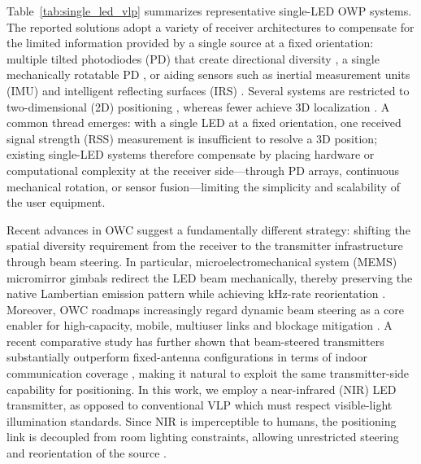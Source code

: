 \documentclass[journal]{IEEEtran}
\begin{document}
Table~\ref{tab:single_led_vlp} summarizes representative single-LED OWP systems. The reported solutions adopt a variety of receiver architectures to compensate for the limited information provided by a single source at a fixed orientation: multiple tilted photodiodes (PD) that create directional diversity \cite{Qin2020, Qin2021, Zia-Ul-Mustafa2023, Zhang2024, Li2024}, a single mechanically rotatable PD \cite{Liu2022, Wang2024, Shi2025}, or aiding sensors such as inertial measurement units (IMU) \cite{Ma2024} and intelligent reflecting surfaces (IRS) \cite{ShiJin2025}. Several systems are restricted to two-dimensional (2D) positioning \cite{Chen2021, Qin2021, Liu2022, Zia-Ul-Mustafa2023, Chassagne2025, Zhang2024, Wang2024, Shi2025, ShiJin2025}, whereas fewer achieve 3D localization \cite{Qin2020, Li2024, Ma2024}. A common thread emerges: with a single LED at a fixed orientation, one received signal strength (RSS) measurement is insufficient to resolve a 3D position; existing single-LED systems therefore compensate by placing hardware or computational complexity at the receiver side---through PD arrays, continuous mechanical rotation, or sensor fusion---limiting the simplicity and scalability of the user equipment.

Recent advances in OWC suggest a fundamentally different strategy: shifting the spatial diversity requirement from the receiver to the transmitter infrastructure through beam steering. In particular, microelectromechanical system (MEMS) micromirror gimbals redirect the LED beam mechanically, thereby preserving the native Lambertian emission pattern while achieving kHz-rate reorientation \cite{Liu:25}. Moreover, OWC roadmaps increasingly regard dynamic beam steering as a core enabler for high-capacity, mobile, multiuser links and blockage mitigation \cite{mi13070990, Zeng2023, Jin2023}. A recent comparative study has further shown that beam-steered transmitters substantially outperform fixed-antenna configurations in terms of indoor communication coverage \cite{AlSatai2026}, making it natural to exploit the same transmitter-side capability for positioning. In this work, we employ a near-infrared (NIR) LED transmitter, as opposed to conventional VLP which must respect visible-light illumination standards. Since NIR is imperceptible to humans, the positioning link is decoupled from room lighting constraints, allowing unrestricted steering and reorientation of the source \cite{Zhu2025}.
\end{document}
